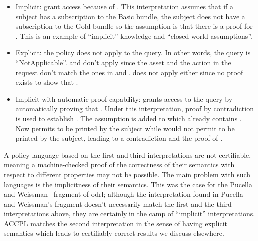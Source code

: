 \begin{itemize}
\item Implicit: grant access because of . This interpretation assumes that if a subject has a subscription to the Basic bundle, the subject does not have a subscription to the Gold bundle so the assumption is that there is a proof for . This is an example of ``implicit'' knowledge and ``closed world assumptions''.

\item Explicit: the policy does not apply to the query. In other words, the query is ``NotApplicable''.  and  don't apply since the asset and the action in the request don't match the ones in  and .  does not apply either since no proof exists to show that . 

\item Implicit with automatic proof capability: grants access to the query by automatically proving that . Under this interpretation, proof by contradiction is used to establish . The assumption  is added to  which already contains . Now  permits  to be printed by the subject while  would not permit  to be printed by the subject, leading to a contradiction and the proof of .
\end{itemize}

A policy language based on the first and third interpretations are not certifiable, meaning a machine-checked proof of the correctness of their semantics with respect to different properties may not be possible. The main problem with such languages is the implicitness of their semantics. This was the case for the Pucella and Weissman~\cite{pucella2006} fragment of \ac{odrl}; although the interpretation found in Pucella and Weissman's fragment doesn't necessarily match the first and the third interpretations above, they are certainly in the camp of ``implicit'' interpretations. \ac{ACCPL} matches the second interpretation in the sense of having explicit semantics which leads to certifiably correct results we discuss elsewhere. 





